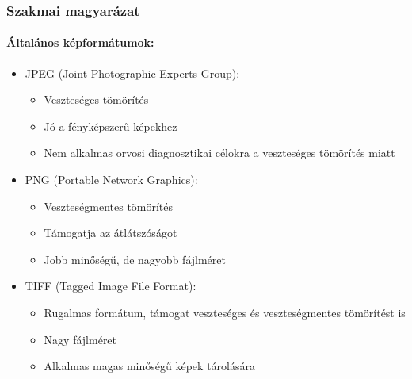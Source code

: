 \documentclass[a4paper,12pt]{article}
\begin{document}
\subsubsection{Szakmai magyarázat}

\paragraph{Általános képformátumok:} \begin{itemize} \item JPEG (Joint Photographic Experts Group): \begin{itemize} \item Veszteséges tömörítés \item Jó a fényképszerű képekhez \item Nem alkalmas orvosi diagnosztikai célokra a veszteséges tömörítés miatt \end{itemize} \item PNG (Portable Network Graphics): \begin{itemize} \item Veszteségmentes tömörítés \item Támogatja az átlátszóságot \item Jobb minőségű, de nagyobb fájlméret \end{itemize} \item TIFF (Tagged Image File Format): \begin{itemize} \item Rugalmas formátum, támogat veszteséges és veszteségmentes tömörítést is \item Nagy fájlméret \item Alkalmas magas minőségű képek tárolására \end{itemize} \end{itemize}
\end{document}
